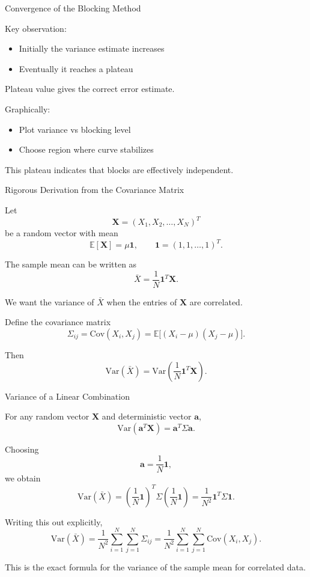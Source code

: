 \documentclass{beamer}
\begin{document}

\begin{frame}{Convergence of the Blocking Method}

  Key observation:

  \begin{itemize}
  \item Initially the variance estimate increases
  \item Eventually it reaches a plateau
  \end{itemize}

  Plateau value gives the correct error estimate.

  Graphically:

  \begin{itemize}
  \item Plot variance vs blocking level
  \item Choose region where curve stabilizes
  \end{itemize}

  This plateau indicates that blocks are effectively independent.
\end{frame}

\begin{frame}{Rigorous Derivation from the Covariance Matrix}

Let
\[
\bm{X} = (X_1,X_2,\dots,X_N)^T
\]
be a random vector with mean
\[
\mathbb{E}[\bm{X}] = \mu \bm{1},
\qquad
\bm{1} = (1,1,\dots,1)^T .
\]

The sample mean can be written as
\[
\bar X = \frac{1}{N}\bm{1}^T \bm{X}.
\]

We want the variance of $\bar X$ when the entries of $\bm{X}$ are correlated.

Define the covariance matrix
\[
\Sigma_{ij} = \mathrm{Cov}(X_i,X_j)
= \mathbb{E}\big[(X_i-\mu)(X_j-\mu)\big].
\]

Then
\[
\mathrm{Var}(\bar X)
=
\mathrm{Var}\left(\frac{1}{N}\bm{1}^T\bm{X}\right).
\]
\end{frame}

\begin{frame}{Variance of a Linear Combination}

For any random vector $\bm{X}$ and deterministic vector $\bm{a}$,
\[
\mathrm{Var}(\bm{a}^T\bm{X}) = \bm{a}^T \Sigma \bm{a}.
\]

Choosing
\[
\bm{a} = \frac{1}{N}\bm{1},
\]
we obtain
\[
\mathrm{Var}(\bar X)
=
\left(\frac{1}{N}\bm{1}\right)^T
\Sigma
\left(\frac{1}{N}\bm{1}\right)
=
\frac{1}{N^2}\bm{1}^T\Sigma\bm{1}.
\]

Writing this out explicitly,
\[
\mathrm{Var}(\bar X)
=
\frac{1}{N^2}\sum_{i=1}^N \sum_{j=1}^N \Sigma_{ij}
=
\frac{1}{N^2}\sum_{i=1}^N \sum_{j=1}^N \mathrm{Cov}(X_i,X_j).
\]

This is the exact formula for the variance of the sample mean for correlated data.
\end{frame}
\end{document}
